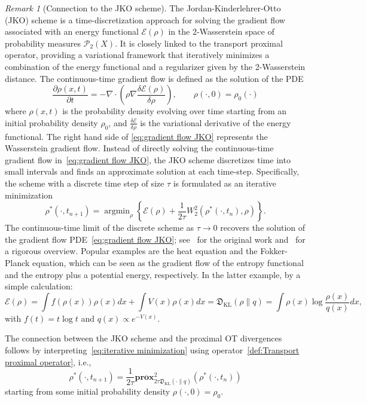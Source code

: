 \documentclass{amsart}
\newcommand{\rb}[1]{#1} %
\theoremstyle{definition}
\theoremstyle{remark}
\newtheorem{remark}[theorem]{Remark}
\numberwithin{equation}{section}
\DeclareMathOperator*{\argmin}{argmin}
\begin{document}
\begin{remark}[Connection to the JKO scheme]\label{rem: Connection to JKO scheme} The Jordan-Kinderlehrer-Otto (JKO) scheme is a time-discretization approach for solving the gradient flow associated with an energy functional $\mathcal{E}(\rho)$ in the 2-Wasserstein space of probability measures $\mathcal{P}_2(X)$. It is closely linked to the transport proximal operator, providing a variational framework that iteratively minimizes a combination of the energy functional and a regularizer given by the 2-Wasserstein distance. The continuous-time gradient flow is defined as the \rb{solution of the PDE} 
    \begin{equation}\label{eq:gradient flow JKO}
    \frac{\partial \rho(x,t)}{\partial t}=-\nabla\cdot \left(\rho\nabla\frac{\delta\mathcal{E}(\rho)}{\delta\rho}\right), \qquad \rho(\cdot,0) = \rho_0(\cdot)
    \end{equation}
    where $\rho(x,t)$ is the probability density evolving over time \rb{starting from an initial probability density $\rho_0$}, and $\frac{\delta\mathcal{E}}{\delta\rho}$ is the variational derivative of the energy functional. The right hand side of \eqref{eq:gradient flow JKO} represents the  Wasserstein gradient flow. 
    Instead of directly solving the continuous-time gradient flow in~\eqref{eq:gradient flow JKO}, the JKO scheme discretizes time into small intervals and finds an approximate solution at each time-step. Specifically, the scheme with a discrete time step of size $\tau$ is formulated as an iterative minimization 
    \begin{equation}\label{eq:iterative minimization}
\rho^*(\cdot,t_{n+1})=\argmin_{\rho}\left\{\mathcal{E}(\rho)+\frac{1}{2\tau}W^2_2(\rho^*(\cdot,t_n),\rho)\right\}.
    \end{equation}
    \rb{The continuous-time limit of the discrete scheme as $\tau\to0$ recovers the solution of the gradient flow PDE~\eqref{eq:gradient flow JKO}; see~\cite{jordan1998variational} for the original work and~\cite{ambrosio2005gradient} for a rigorous overview}. Popular examples are the heat equation and the Fokker-Planck equation, which can be seen as the gradient flow of the entropy functional and the entropy plus a potential energy, respectively. In the latter example, by a simple calculation:  
    \[
    \mathcal{E}(\rho)=\int f(\rho(x)) \rho(x)dx+\int V(x) \rho(x)dx
    =\mathfrak{D}_{\textrm{KL}}(\rho\|q)=\int\rho(x)\log\frac{\rho(x)}{q(x)}dx,\]
    with $f(t)=t\log t$ and $q(x)\propto e^{-V(x)}$. 
    
    The connection between the JKO scheme and the proximal OT divergences follows by interpreting~\eqref{eq:iterative minimization} using operator~\eqref{def:Transport proximal operator}, i.e.,
    \[
    \rho^*(\cdot,t_{n+1})=\frac{1}{2\tau}\textbf{prox}^2_{2\tau \mathfrak{D_{\mathrm{KL}}}(\cdot\|q)}(\rho^*(\cdot,t_n))
    \] 
    starting from some initial probability density $\rho(\cdot,0) = \rho_0$.
\end{remark}
\end{document}

